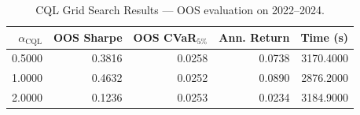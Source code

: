 \begin{table}
\caption{CQL Grid Search Results — OOS evaluation on 2022–2024.}
\label{tab:grid_search}
\begin{tabular}{rrrrr}
\toprule
$\alpha_{\text{CQL}}$ & OOS Sharpe & OOS CVaR$_{5\%}$ & Ann. Return & Time (s) \\
\midrule
0.5000 & 0.3816 & 0.0258 & 0.0738 & 3170.4000 \\
1.0000 & 0.4632 & 0.0252 & 0.0890 & 2876.2000 \\
2.0000 & 0.1236 & 0.0253 & 0.0234 & 3184.9000 \\
\bottomrule
\end{tabular}
\end{table}
